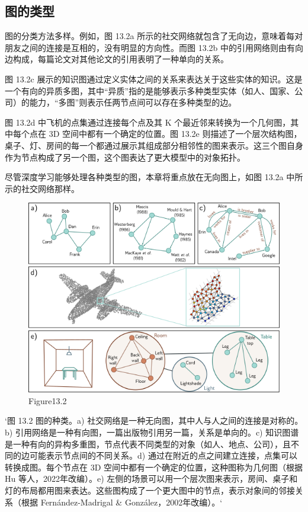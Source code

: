 \subsection{图的类型}
图的分类方法多样。例如，图 13.2a 所示的社交网络就包含了无向边，意味着每对朋友之间的连接是互相的，没有明显的方向性。而图 13.2b 中的引用网络则由有向边构成，每篇论文对其他论文的引用表明了一种单向的关系。

图 13.2c 展示的知识图通过定义实体之间的关系来表达关于这些实体的知识。这是一个有向的异质多图，其中“异质”指的是能够表示多种类型实体（如人、国家、公司）的能力，“多图”则表示任两节点间可以存在多种类型的边。

图 13.2d 中飞机的点集通过连接每个点及其 K 个最近邻来转换为一个几何图，其中每个点在 3D 空间中都有一个确定的位置。图 13.2e 则描述了一个层次结构图，桌子、灯、房间的每一个都通过展示其组成部分相邻性的图来表示。这三个图自身作为节点构成了另一个图，这个图表达了更大模型中的对象拓扑。

尽管深度学习能够处理各种类型的图，本章将重点放在无向图上，如图 13.2a 中所示的社交网络那样。

\begin{figure}[ht!]
\centering
\includegraphics[width=0.7\linewidth]{png/chapter13/GraphTypes.png}
\caption{Figure13.2}
\end{figure}

`图 13.2 图的种类。a) 社交网络是一种无向图，其中人与人之间的连接是对称的。b) 引用网络是一种有向图，一篇出版物引用另一篇，关系是单向的。c) 知识图谱是一种有向的异构多重图，节点代表不同类型的对象（如人、地点、公司），且不同的边可能表示节点间的不同关系。d) 通过在附近的点之间建立连接，点集可以转换成图。每个节点在 3D 空间中都有一个确定的位置，这种图称为几何图（根据 Hu 等人，2022年改编）。e) 左侧的场景可以用一个层次图来表示，房间、桌子和灯的布局都用图来表达。这些图构成了一个更大图中的节点，表示对象间的邻接关系（根据 Fernández-Madrigal \& González，2002年改编）。`


